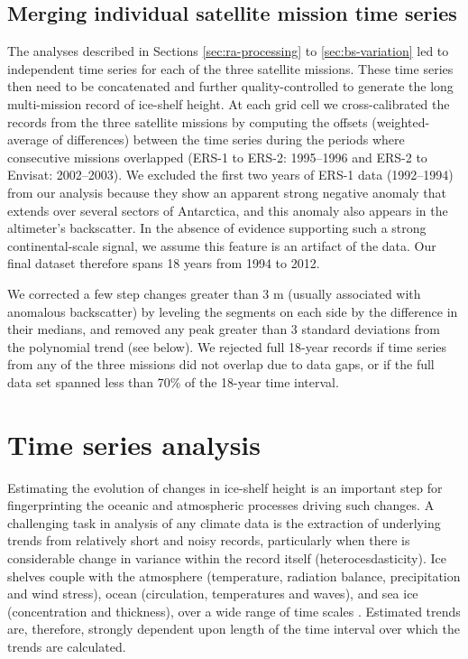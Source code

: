 \subsection{Merging individual satellite mission time series}

\noindent
The analyses described in Sections \ref{sec:ra-processing} to \ref{sec:bs-variation} led to independent time series for each of the three satellite missions. These time series then need to be concatenated and further quality-controlled to generate the long multi-mission record of ice-shelf height. At each grid cell we cross-calibrated the records from the three satellite missions by computing the offsets (weighted-average of differences) between the time series during the periods where consecutive missions overlapped (ERS-1 to ERS-2: 1995--1996 and ERS-2 to Envisat: 2002--2003). We excluded the first two years of ERS-1 data (1992--1994) from our analysis because they show an apparent strong negative anomaly that extends over several sectors of Antarctica, and this anomaly also appears in the altimeter's backscatter. In the absence of evidence supporting such a strong continental-scale signal, we assume this feature is an artifact of the data. Our final dataset therefore spans 18 years from 1994 to 2012.

We corrected a few step changes greater than 3 m (usually associated with anomalous backscatter) by leveling the segments on each side by the difference in their medians, and removed any peak greater than 3 standard deviations from the polynomial trend (see below). We rejected full 18-year records if time series from any of the three missions did not overlap due to data gaps, or if the full data set spanned less than 70\% of the 18-year time interval.

\section{Time series analysis}

\noindent
Estimating the evolution of changes in ice-shelf height is an important step for fingerprinting the oceanic and atmospheric processes driving such changes. A challenging task in analysis of any climate data is the extraction of underlying trends from relatively short and noisy records, particularly when there is considerable change in variance within the record itself (heterocesdasticity). Ice shelves couple with the atmosphere (temperature, radiation balance, precipitation and wind stress), ocean (circulation, temperatures and waves), and sea ice (concentration and thickness), over a wide range of time scales \parencite{Paolo2015}. Estimated trends are, therefore, strongly dependent upon length of the time interval over which the trends are calculated.

